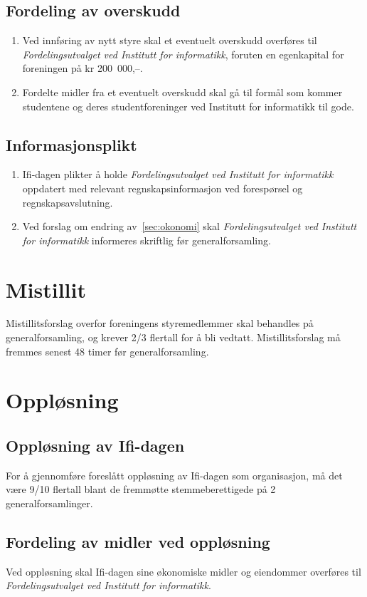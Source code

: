 \documentclass[norsk,a4paper]{article}
\begin{document}
\subsection{Fordeling av overskudd}
\begin{enumerate}
	\item Ved innføring av nytt styre skal et eventuelt overskudd overføres til \textit{Fordelingsutvalget ved Institutt for informatikk}, foruten en egenkapital for foreningen på kr 200~000,--. 
	\item Fordelte midler fra et eventuelt overskudd skal gå til formål som kommer studentene og deres studentforeninger ved Institutt for informatikk til gode.
\end{enumerate}

\subsection{Informasjonsplikt}
\begin{enumerate}
	\item Ifi-dagen plikter å holde \textit{Fordelingsutvalget ved Institutt for informatikk} oppdatert med relevant regnskapsinformasjon ved forespørsel og regnskapsavslutning.
	\item Ved forslag om endring av~\ref{sec:okonomi} skal \textit{Fordelingsutvalget ved Institutt for informatikk} informeres skriftlig før generalforsamling.
\end{enumerate}

\section{Mistillit}
Mistillitsforslag overfor foreningens styremedlemmer skal behandles på generalforsamling, og krever 2/3 flertall for å bli vedtatt. Mistillitsforslag må fremmes senest 48 timer før generalforsamling.

\section{Oppløsning}
\subsection{Oppløsning av Ifi-dagen}
For å gjennomføre foreslått oppløsning av Ifi-dagen som organisasjon, må det være 9/10 flertall
blant de fremmøtte stemmeberettigede på 2 generalforsamlinger.

\subsection{Fordeling av midler ved oppløsning}
Ved oppløsning skal Ifi-dagen sine økonomiske midler og eiendommer overføres til
\textit{Fordelingsutvalget ved Institutt for informatikk}.\label{ref:lastpage}
\end{document}
